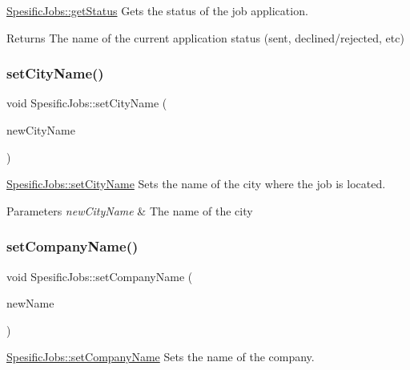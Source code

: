 \hyperlink{class_spesific_jobs_aefe905d920961199fec0aff37a34b50d}{Spesific\+Jobs\+::get\+Status} Gets the status of the job application. 

\begin{DoxyReturn}{Returns}
The name of the current application status (sent, declined/rejected, etc) 
\end{DoxyReturn}
\mbox{\label{class_spesific_jobs_a67b162aa9ad12ed8ffba061edff96cdf}} 
\subsubsection{\texorpdfstring{set\+City\+Name()}{setCityName()}}
{\footnotesize\ttfamily void Spesific\+Jobs\+::set\+City\+Name (\begin{DoxyParamCaption}\item[{Q\+String}]{new\+City\+Name }\end{DoxyParamCaption})}



\hyperlink{class_spesific_jobs_a67b162aa9ad12ed8ffba061edff96cdf}{Spesific\+Jobs\+::set\+City\+Name} Sets the name of the city where the job is located. 


\begin{DoxyParams}{Parameters}
{\em new\+City\+Name} & The name of the city \\
\hline
\end{DoxyParams}
\mbox{\label{class_spesific_jobs_aeacc56572911219fddf2f1439a70ed74}} 
\subsubsection{\texorpdfstring{set\+Company\+Name()}{setCompanyName()}}
{\footnotesize\ttfamily void Spesific\+Jobs\+::set\+Company\+Name (\begin{DoxyParamCaption}\item[{Q\+String}]{new\+Name }\end{DoxyParamCaption})}



\hyperlink{class_spesific_jobs_aeacc56572911219fddf2f1439a70ed74}{Spesific\+Jobs\+::set\+Company\+Name} Sets the name of the company. 


